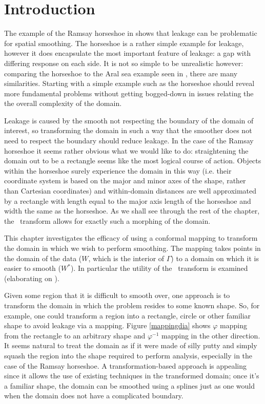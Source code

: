 \label{chap-sc}
\section{Introduction}

The example of the Ramsay horseshoe in  shows that leakage can be problematic for spatial smoothing. \label{cor-3s3}The horseshoe is a rather simple example for leakage, however it does encapsulate the most important feature of leakage: a gap with differing response on each side. It is not so simple to be unrealistic however: comparing the horseshoe to the Aral sea example seen in , there are many similarities. Starting with a simple example such as the horseshoe should reveal more fundamental problems without getting bogged-down in issues relating the the overall complexity of the domain. 

Leakage is caused by the smooth not respecting the boundary of the domain of interest, so transforming the domain in such a way that the smoother does not need to respect the boundary should reduce leakage. In the case of the Ramsay horseshoe it seems rather obvious what we would like to do: straightening the domain out to be a rectangle seems like the most logical course of action. Objects within the horseshoe surely experience the domain in this way (i.e. their coordinate system is based on the major and minor axes of the shape, rather than Cartesian coordinates) and within-domain distances are well approximated by a rectangle with length equal to the major axis length of the horseshoe and width the same as the horseshoe. As we shall see through the rest of the chapter, the \sch\ transform allows for exactly such a morphing of the domain.

This chapter investigates the efficacy of using a conformal mapping to transform the domain in which we wish to perform smoothing. The mapping takes points in the domain of the data ($W$, which is the interior of $\Gamma$\label{cor-3s1-3}) to a domain on which it is easier to smooth ($W^*$). In particular the utility of the \sch\ transform is examined (elaborating on \cite{eilerstalk}).

Given some region that it is difficult to smooth over, one approach is to transform the domain in which the problem resides to some known shape. So, for example, one could transform a region into a rectangle, circle or other familiar shape to avoid leakage via a mapping. Figure \ref{mappingdia} shows $\varphi$ mapping from the rectangle to an arbitrary shape and $\varphi^{-1}$ mapping in the other direction\label{cor-3s4-2}. It seems natural to treat the domain as if it were made of silly putty and simply squash the region into the shape required to perform analysis, especially in the case of the Ramsay horseshoe. A transformation-based approach is appealing since it allows the use of existing techniques in the transformed domain; once it's a familiar shape, the domain can be smoothed using a splines just as one would when the domain does not have a complicated boundary.

